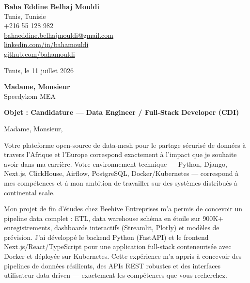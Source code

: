 \documentclass[a4paper,11pt]{article}
\begin{document}
\begin{flushright}
{\bfseries Baha Eddine Belhaj Mouldi}\\
Tunis, Tunisie\\
+216 55 128 982\\
\href{mailto:bahaeddine.belhajmouldi@gmail.com}{bahaeddine.belhajmouldi@gmail.com}\\
\href{https://linkedin.com/in/bahamouldi}{linkedin.com/in/bahamouldi}\\
\href{https://github.com/bahamouldi}{github.com/bahamouldi}
\end{flushright}

\vspace{0.8cm}

\begin{flushleft}
Tunis, le 11 juillet 2026

\vspace{0.8cm}

{\bfseries Madame, Monsieur}\\
Speedykom MEA

\vspace{0.6cm}

{\bfseries Objet : Candidature --- Data Engineer / Full-Stack Developer (CDI)}
\end{flushleft}

\vspace{0.6cm}

Madame, Monsieur,

Votre plateforme open-source de data-mesh pour le partage sécurisé de données à travers l'Afrique et l'Europe correspond exactement à l'impact que je souhaite avoir dans ma carrière. Votre environnement technique --- Python, Django, Next.js, ClickHouse, Airflow, PostgreSQL, Docker/Kubernetes --- correspond à mes compétences et à mon ambition de travailler sur des systèmes distribués à continental scale.

Mon projet de fin d'études chez Beehive Entreprises m'a permis de concevoir un pipeline data complet : ETL, data warehouse schéma en étoile sur 900K+ enregistrements, dashboards interactifs (Streamlit, Plotly) et modèles de prévision. J'ai développé le backend Python (FastAPI) et le frontend Next.js/React/TypeScript pour une application full-stack conteneurisée avec Docker et déployée sur Kubernetes. Cette expérience m'a appris à concevoir des pipelines de données résilients, des APIs REST robustes et des interfaces utilisateur data-driven --- exactement les compétences que vous recherchez.
\end{document}
